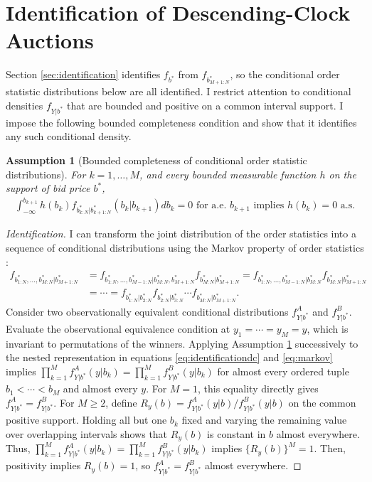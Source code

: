 \documentclass[12pt]{article}
\newtheorem{assumption}{Assumption}
\theoremstyle{definition} %
\begin{document}
\appendix
\setcounter{assumption}{0}
\renewcommand{\theassumption}{A\arabic{assumption}}
\renewcommand{\theHassumption}{A\arabic{assumption}}

\section{Identification of Descending-Clock Auctions}
\label{sec:identificationdc}

Section \ref{sec:identification} identifies $f_{b^\ast} $ from $f_{b_{M+1:N}^\ast} $, so the conditional order statistic distributions below are all identified. I restrict attention to conditional densities $f_{Y|b^\ast} $ that are bounded and positive on a common interval support. I impose the following bounded completeness condition and show that it identifies any such conditional density.
\begin{assumption}[Bounded completeness of conditional order statistic distributions]
\label{assu:complete}
For $k = 1,\dots,M $, and every bounded measurable function $h$ on the support of bid price $b^\ast $,
\begin{align*}
\int_{-\infty}^{b_{k+1}} h(b_k) f_{b_{k:N}^\ast|b_{k+1:N}^\ast}(b_k|b_{k+1}) db_k = 0 \text{ for a.e. } b_{k+1} \text{ implies } h(b_k) = 0 \text{ a.s.}
\end{align*}
\end{assumption}
\begin{proof}[Identification]
I can transform the joint distribution of the order statistics into a sequence of conditional distributions using the Markov property of order statistics \citep*[e.g.,][]{Arnold2008}:
\begin{align}
\label{eq:markov}
f_{b_{1:N}^\ast,\dots,b_{M:N}^\ast|b_{M+1:N}^\ast} &= f_{b_{1:N}^\ast,\dots,b_{M-1:N}^\ast|b_{M:N}^\ast,b_{M+1:N}^\ast} f_{b_{M:N}^\ast|b_{M+1:N}^\ast} = f_{b_{1:N}^\ast,\dots,b_{M-1:N}^\ast|b_{M:N}^\ast} f_{b_{M:N}^\ast|b_{M+1:N}^\ast} \nonumber\\
&= \cdots = f_{b_{1:N}^\ast|b_{2:N}^\ast} f_{b_{2:N}^\ast|b_{3:N}^\ast} \cdots f_{b_{M:N}^\ast|b_{M+1:N}^\ast}.
\end{align}
Consider two observationally equivalent conditional distributions $f_{Y|b^\ast}^A $ and $f_{Y|b^\ast}^B $. Evaluate the observational equivalence condition at $y_1=\cdots=y_M=y $, which is invariant to permutations of the winners. Applying Assumption \ref{assu:complete} successively to the nested representation in equations \eqref{eq:identificationdc} and \eqref{eq:markov} implies $\prod_{k=1}^M f_{Y|b^\ast}^A(y|b_k) = \prod_{k=1}^M f_{Y|b^\ast}^B(y|b_k)$ for almost every ordered tuple $b_1<\cdots<b_M $ and almost every $y $. For $M=1 $, this equality directly gives $f_{Y|b^\ast}^A=f_{Y|b^\ast}^B $. For $M\geq2 $, define $R_y(b)=f_{Y|b^\ast}^A(y|b)/f_{Y|b^\ast}^B(y|b) $ on the common positive support. Holding all but one $b_k $ fixed and varying the remaining value over overlapping intervals shows that $R_y(b) $ is constant in $b $ almost everywhere. Thus, $\prod_{k=1}^M f_{Y|b^\ast}^A(y|b_k) = \prod_{k=1}^M f_{Y|b^\ast}^B(y|b_k)$ implies $\{R_y(b)\}^M = 1 $. Then, positivity implies $R_y(b)=1 $, so $f_{Y|b^\ast}^A=f_{Y|b^\ast}^B $ almost everywhere.
\end{proof}

\onehalfspacing


\end{document}
